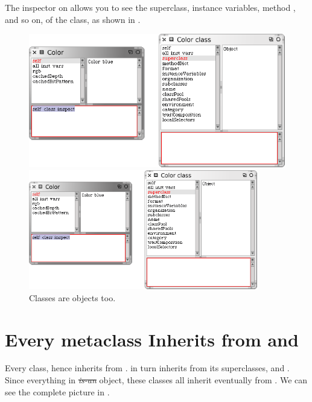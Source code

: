 \documentclass[a4paper,10pt,twoside]{book}
\begin{document}
The inspector on  allows you to see the superclass, instance variables, method , and so on, of the  class, as shown in .

\begin{center}
\begin{figure}[!ht]
\ifluluelse
	{\centerline{\includegraphics[width=\textwidth]{InspectingColor}}}
	{\centerline{\includegraphics[width=10cm]{InspectingColor}}}
\caption{Classes are objects too.\label{fig:inspectingColor}}
\end{figure}
\end{center}

\section{Every metaclass Inherits from  and }

Every   class, hence inherits from .
 in turn inherits from its superclasses,  and .
Since everything in \st \emph{is-an} object, these classes all inherit eventually from .
We can see the complete picture in .
\end{document}
